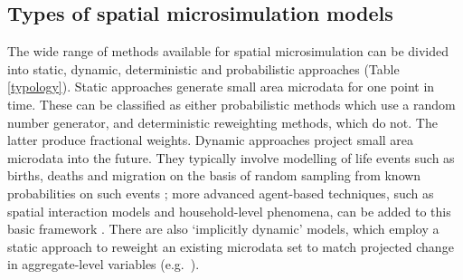 \subsection{Types of spatial microsimulation models} %
\label{types-msim}
The wide range of methods available for spatial microsimulation can be divided
into static, dynamic, deterministic and probabilistic approaches (Table
\ref{typology}). Static approaches generate small
area microdata for one point in time. These can be classified as
either probabilistic methods which use a random number generator, and
deterministic reweighting methods, which do not. The latter produce
fractional weights. Dynamic approaches project small
area microdata into the future. They typically involve modelling of
life events such as births, deaths and migration on the basis of random
sampling from known probabilities on such events \citep{Ballas2005c,
Vidyattama2010}; more advanced agent-based techniques, such as spatial
interaction models and household-level phenomena, can be added to this basic
framework \citep{Wu2008, Wu2010}. There
are also `implicitly dynamic' models, which employ a static
approach to reweight an existing microdata set to match
projected change in aggregate-level variables
(e.g.~\citealp{Ballas2005-ireland}).


